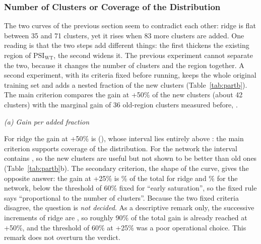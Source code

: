 \begin{table}[htbp]
  \centering
  \caption{Pre-registered verdicts of P1 and P0}\label{tab:verdict}
  
\end{table}

\subsubsection{Number of Clusters or Coverage of the Distribution}\label{sec:res-partb}
The two curves of the previous section seem to contradict each other: ridge is flat between 35 and 71
clusters, yet it rises when 83 more clusters are added. One reading is that the two steps add different things:
the first thickens the existing region of $\mathrm{PSI}_{\mathrm{WT}}$, the second widens it. The previous experiment
cannot separate the two, because it changes the number of clusters and the region together. A second
experiment, with its criteria fixed before running, keeps the whole original training set and adds a
nested fraction of the new clusters (Table~\ref{tab:partb}). The main criterion compares the gain at +50\% of the new
clusters (about 42 clusters) with the marginal gain of 36 old-region clusters measured before, \nBaseMarginal{}.

\begin{table}[htbp]
  \centering
  \caption[Gain over the benchmark training set when a fraction of the new clusters is added]{Gain over the benchmark training set when a fraction of the new clusters is added.
  (a) Gain per added fraction. (b) Pre-registered verdicts; the reference marginal gain of
  old-region clusters is \nBaseMarginal.}\label{tab:partb}
  {\small\textit{(a) Gain per added fraction}}\par\smallskip
  
  \par{}\par\smallskip
  
\end{table}

For ridge the gain at +50\% is \nBFiftyRidge{} (\nBFiftyRidgeCI{}), whose interval lies entirely above \nBaseMarginal{}:
the main criterion supports coverage of the distribution. For the network the interval contains \nBaseMarginal{}, so the new
clusters are useful but not shown to be better than old ones (Table~\ref{tab:partb}b). The secondary
criterion, the shape of the curve, gives the opposite answer: the gain at +25\% is \nBFracRidge\% of the total
for ridge and \nBFracGate\% for the network, below the threshold of 60\% fixed for ``early saturation'', so the
fixed rule says ``proportional to the number of clusters''. Because the two fixed criteria disagree, the
question is \emph{not decided}. As a descriptive remark only, the successive increments of ridge are
\nBStepsRidge, so roughly 90\% of the total gain is already reached at +50\%, and the threshold of 60\% at +25\% was a
poor operational choice. This remark does not overturn the verdict.

